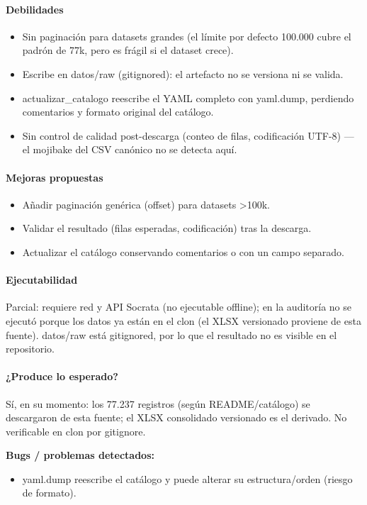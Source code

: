 \paragraph{Debilidades}
\begin{itemize}
  \item Sin paginación para datasets grandes (el límite por defecto 100.000 cubre el padrón de 77k, pero es frágil si el dataset crece).
  \item Escribe en datos/raw (gitignored): el artefacto no se versiona ni se valida.
  \item actualizar\_catalogo reescribe el YAML completo con yaml.dump, perdiendo comentarios y formato original del catálogo.
  \item Sin control de calidad post-descarga (conteo de filas, codificación UTF-8) --- el mojibake del CSV canónico no se detecta aquí.
\end{itemize}

\paragraph{Mejoras propuestas}
\begin{itemize}
  \item Añadir paginación genérica (offset) para datasets >100k.
  \item Validar el resultado (filas esperadas, codificación) tras la descarga.
  \item Actualizar el catálogo conservando comentarios o con un campo separado.
\end{itemize}

\paragraph{Ejecutabilidad}
Parcial: requiere red y API Socrata (no ejecutable offline); en la auditoría no se ejecutó porque los datos ya están en el clon (el XLSX versionado proviene de esta fuente). datos/raw está gitignored, por lo que el resultado no es visible en el repositorio.

\paragraph{¿Produce lo esperado?}
Sí, en su momento: los 77.237 registros (según README/catálogo) se descargaron de esta fuente; el XLSX consolidado versionado es el derivado. No verificable en clon por gitignore.

\begin{tcolorbox}[riesgo]
\textbf{Bugs / problemas detectados:}
\begin{itemize}
  \item yaml.dump reescribe el catálogo y puede alterar su estructura/orden (riesgo de formato).
\end{itemize}
\end{tcolorbox}


